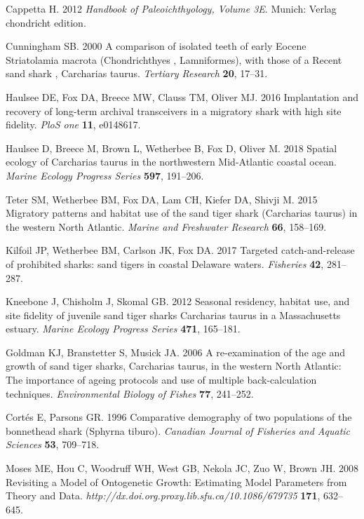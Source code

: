 \documentclass[]{rsos}%
\begin{document}
\begin{thebibliography}{99}
Cappetta H. 2012 {\em {Handbook of Paleoichthyology, Volume 3E}}.
Munich: Verlag chondricht edition.

Cunningham SB. 2000  {A comparison of isolated teeth of early Eocene
  Striatolamia macrota (Chondrichthyes , Lamniformes), with those of a Recent
  sand shark , Carcharias taurus}. {\em Tertiary Research} \textbf{20}, 17--31.

Haulsee DE, Fox DA, Breece MW, Clauss TM, Oliver MJ. 2016  Implantation and
  recovery of long-term archival transceivers in a migratory shark with high
  site fidelity. {\em PloS one} \textbf{11}, e0148617.

Haulsee D, Breece M, Brown L, Wetherbee B, Fox D, Oliver M. 2018  Spatial
  ecology of Carcharias taurus in the northwestern Mid-Atlantic coastal ocean.
  {\em Marine Ecology Progress Series} \textbf{597}, 191--206.

Teter SM, Wetherbee BM, Fox DA, Lam CH, Kiefer DA, Shivji M. 2015  {Migratory
  patterns and habitat use of the sand tiger shark (Carcharias taurus) in the
  western North Atlantic}. {\em Marine and Freshwater Research} \textbf{66},
  158--169.

Kilfoil JP, Wetherbee BM, Carlson JK, Fox DA. 2017  Targeted catch-and-release
  of prohibited sharks: sand tigers in coastal Delaware waters. {\em Fisheries}
  \textbf{42}, 281--287.

Kneebone J, Chisholm J, Skomal GB. 2012  {Seasonal residency, habitat use, and
  site fidelity of juvenile sand tiger sharks Carcharias taurus in a
  Massachusetts estuary}. {\em Marine Ecology Progress Series} \textbf{471},
  165--181.

Goldman KJ, Branstetter S, Musick JA. 2006  {A re-examination of the age and
  growth of sand tiger sharks, Carcharias taurus, in the western North
  Atlantic: The importance of ageing protocols and use of multiple
  back-calculation techniques}. {\em Environmental Biology of Fishes}
  \textbf{77}, 241--252.

Cort{\'e}s E, Parsons GR. 1996  Comparative demography of two populations of
  the bonnethead shark (Sphyrna tiburo). {\em Canadian Journal of Fisheries and
  Aquatic Sciences} \textbf{53}, 709--718.

Moses ME, Hou C, Woodruff WH, West GB, Nekola JC, Zuo W, Brown JH. 2008
  {Revisiting a Model of Ontogenetic Growth: Estimating Model Parameters from
  Theory and Data}. {\em http://dx.doi.org.proxy.lib.sfu.ca/10.1086/679735}
  \textbf{171}, 632--645.


\end{thebibliography}
\end{document}
